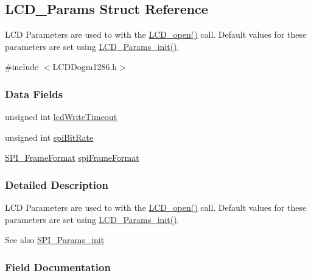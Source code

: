 \subsection{L\+C\+D\+\_\+\+Params Struct Reference}
\label{struct_l_c_d___params}


L\+C\+D Parameters are used to with the \hyperlink{_l_c_d_dogm1286_8h_a7eda62cc528319af943746da6b5d7688}{L\+C\+D\+\_\+open()} call. Default values for these parameters are set using \hyperlink{_l_c_d_dogm1286_8h_a65cc6910ac18d5d823205870acaf3dc3}{L\+C\+D\+\_\+\+Params\+\_\+init()}.  




{\ttfamily \#include $<$L\+C\+D\+Dogm1286.\+h$>$}

\subsubsection*{Data Fields}
\begin{DoxyCompactItemize}
\item 
unsigned int \hyperlink{struct_l_c_d___params_a4d0eed4a93a0785c12eb26c48be77a28}{lcd\+Write\+Timeout}
\item 
unsigned int \hyperlink{struct_l_c_d___params_a5670d1d33180c428d0b84154ca658098}{spi\+Bit\+Rate}
\item 
\hyperlink{_s_p_i_8h_a4e1f33555dfa8147205af5b266f3a489}{S\+P\+I\+\_\+\+Frame\+Format} \hyperlink{struct_l_c_d___params_a27584b38ae256abf6358c4158da5be60}{spi\+Frame\+Format}
\end{DoxyCompactItemize}


\subsubsection{Detailed Description}
L\+C\+D Parameters are used to with the \hyperlink{_l_c_d_dogm1286_8h_a7eda62cc528319af943746da6b5d7688}{L\+C\+D\+\_\+open()} call. Default values for these parameters are set using \hyperlink{_l_c_d_dogm1286_8h_a65cc6910ac18d5d823205870acaf3dc3}{L\+C\+D\+\_\+\+Params\+\_\+init()}. 

\begin{DoxySeeAlso}{See also}
\hyperlink{_s_p_i_8h_a9c3dd1748332fd6e31c79a6538a71642}{S\+P\+I\+\_\+\+Params\+\_\+init} 
\end{DoxySeeAlso}


\subsubsection{Field Documentation}
